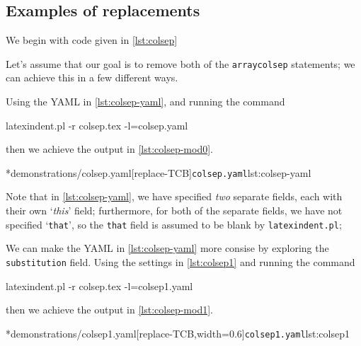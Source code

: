 \subsection{Examples of replacements}
	\begin{example}
		We begin with code given in \cref{lst:colsep}


		Let's assume that our goal is to remove both of the \texttt{arraycolsep} statements; we can achieve this in
		a few different ways.

		Using the YAML in \cref{lst:colsep-yaml}, and running the command
		\begin{commandshell}
latexindent.pl -r colsep.tex -l=colsep.yaml
\end{commandshell}
		then we achieve the output in \cref{lst:colsep-mod0}.
		\begin{cmhtcbraster}[raster column skip=.01\linewidth]
			\cmhlistingsfromfile*[style=yaml-LST]*{demonstrations/colsep.yaml}[replace-TCB]{\texttt{colsep.yaml}}{lst:colsep-yaml}
		\end{cmhtcbraster}
		Note that in \cref{lst:colsep-yaml}, we have specified \emph{two} separate fields, each with their own `\emph{this}' field;
		furthermore, for both of the separate fields, we have not specified `\texttt{that}', so the \texttt{that} field
		is assumed to be blank by \texttt{latexindent.pl};

		We can make the YAML in \cref{lst:colsep-yaml} more consise by exploring the \texttt{substitution} field. Using
		the settings in \cref{lst:colsep1} and running the command
		\begin{commandshell}
latexindent.pl -r colsep.tex -l=colsep1.yaml
\end{commandshell}
		then we achieve the output in \cref{lst:colsep-mod1}.
		\begin{cmhtcbraster}[raster column skip=.01\linewidth,
				raster force size=false,
				raster column 1/.style={add to width=-.1\textwidth}]
			\cmhlistingsfromfile*[style=yaml-LST]*{demonstrations/colsep1.yaml}[replace-TCB,width=0.6\textwidth]{\texttt{colsep1.yaml}}{lst:colsep1}
		\end{cmhtcbraster}


\end{example}
